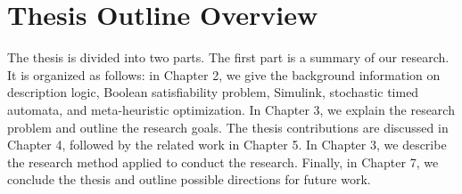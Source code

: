 \section{Thesis Outline Overview}
The thesis is divided into two parts. The first part is a summary of our research. It is organized as follows: in Chapter 2, we give the background information on description logic, Boolean satisfiability problem, Simulink, stochastic timed automata, and meta-heuristic optimization. In Chapter 3, we explain the research problem and outline the research goals. The thesis contributions are discussed in Chapter 4, followed by the related work in Chapter 5. In Chapter 3, we describe the research method applied to conduct the research. Finally, in Chapter 7, we conclude the thesis and outline possible directions for future work.
